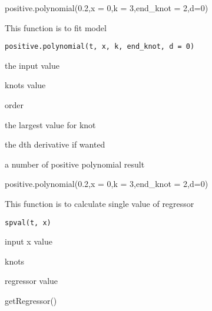 \documentclass[a4paper]{book}
\begin{document}
%
\begin{Examples}
\begin{ExampleCode}
positive.polynomial(0.2,x = 0,k = 3,end_knot = 2,d=0)
\end{ExampleCode}
\end{Examples}
%
\begin{Description}\relax
This function is to fit model
\end{Description}
%
\begin{Usage}
\begin{verbatim}
positive.polynomial(t, x, k, end_knot, d = 0)
\end{verbatim}
\end{Usage}
%
\begin{Arguments}
\begin{ldescription}
\item[\code{t}] the input value

\item[\code{x}] knots value

\item[\code{k}] order

\item[\code{end\_knot}] the largest value for knot

\item[\code{d}] the dth derivative if wanted
\end{ldescription}
\end{Arguments}
%
\begin{Value}
a number of positive polynomial result
\end{Value}
%
\begin{Examples}
\begin{ExampleCode}
positive.polynomial(0.2,x = 0,k = 3,end_knot = 2,d=0)
\end{ExampleCode}
\end{Examples}
%
\begin{Description}\relax
This function is to calculate single value of regressor
\end{Description}
%
\begin{Usage}
\begin{verbatim}
spval(t, x)
\end{verbatim}
\end{Usage}
%
\begin{Arguments}
\begin{ldescription}
\item[\code{t}] input x value

\item[\code{x}] knots
\end{ldescription}
\end{Arguments}
%
\begin{Value}
regressor value
\end{Value}
%
\begin{Examples}
\begin{ExampleCode}
getRegressor()
\end{ExampleCode}
\end{Examples}
\printindex{}
\end{document}
